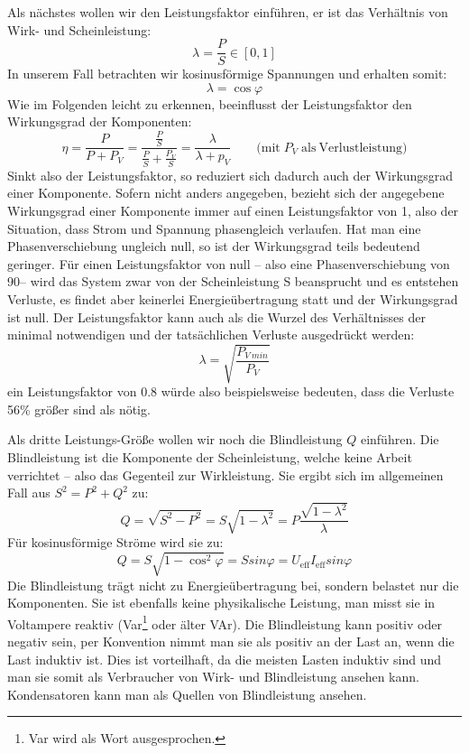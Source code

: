 Als nächstes wollen wir den Leistungsfaktor einführen, er ist das Verhältnis von Wirk- und Scheinleistung:
\begin{equation}
\lambda = \frac{P}{S} \in [0,1]
\end{equation}
In unserem Fall betrachten wir kosinusförmige Spannungen und erhalten somit:
\begin{equation}
\lambda = \cos \varphi
\end{equation}
Wie im Folgenden leicht zu erkennen, beeinflusst der Leistungsfaktor den Wirkungsgrad der Komponenten: %
\begin{equation}
\eta = \frac{P}{P+P_V} = \frac{\frac{P}{S}}{\frac{P}{S}+\frac{P_V}{S}} = \frac{\lambda}{\lambda + p_V} \qquad \mathrm{(mit}\;P_V\;\mathrm{als\: Verlustleistung)}
\end{equation}
Sinkt also der Leistungsfaktor, so reduziert sich dadurch auch der Wirkungsgrad einer Komponente.
Sofern nicht anders angegeben, bezieht sich der angegebene Wirkungsgrad einer Komponente immer auf einen Leistungsfaktor von 1, also der Situation, dass Strom und Spannung phasengleich verlaufen.
Hat man eine Phasenverschiebung ungleich null, so ist der Wirkungsgrad teils bedeutend geringer.
Für einen Leistungsfaktor von null -- also eine Phasenverschiebung von 90\degree -- wird das System zwar von der Scheinleistung S beansprucht und es entstehen Verluste, es findet aber keinerlei Energieübertragung statt und der Wirkungsgrad ist null.
Der Leistungsfaktor kann auch als die Wurzel des Verhältnisses der minimal notwendigen und der tatsächlichen Verluste ausgedrückt werden:
\begin{equation}
\lambda = \sqrt{\frac{P_{V\:min}}{P_V}}	%
\end{equation}
ein Leistungsfaktor von 0.8 würde also beispielsweise bedeuten, dass die Verluste 56\% größer sind als nötig.

Als dritte Leistungs-Größe wollen wir noch die Blindleistung $Q$ einführen.
Die Blindleistung ist die Komponente der Scheinleistung, welche keine Arbeit verrichtet – also das Gegenteil zur Wirkleistung. Sie ergibt sich im allgemeinen Fall aus $S^2=P^2+Q^2$ zu:
\begin{equation}
Q = \sqrt{S^2-P^2} = S \sqrt{1-\lambda^2} = P \frac{\sqrt{1-\lambda^2}}{\lambda}
\end{equation}
Für kosinusförmige Ströme wird sie zu:
\begin{equation}
Q = S \sqrt{1-\cos^2 \varphi} = S sin \varphi = U_{\mathrm{eff}} I_{\mathrm{eff}} sin \varphi
\end{equation}
Die Blindleistung trägt nicht zu Energieübertragung bei, sondern belastet nur die Komponenten. Sie ist ebenfalls keine physikalische Leistung, man misst sie in Voltampere reaktiv (Var\footnote{Var wird als Wort ausgesprochen.} oder älter VAr).
Die Blindleistung kann positiv oder negativ sein, per Konvention nimmt man sie als positiv an der Last an, wenn die Last induktiv ist. Dies ist vorteilhaft, da die meisten Lasten induktiv sind und man sie somit als Verbraucher von Wirk- und Blindleistung ansehen kann. Kondensatoren kann man als Quellen von Blindleistung ansehen.\cite{Harrison}

